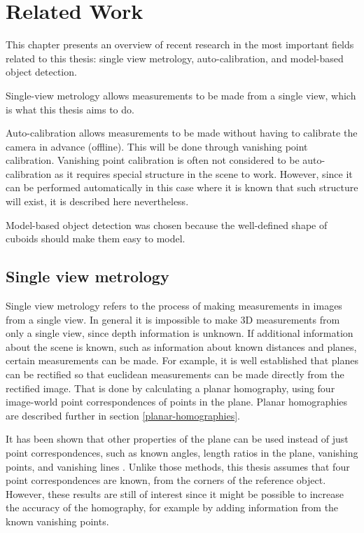 \chapter{Related Work}
This chapter presents an overview of recent research in the most important fields related to this thesis: single view metrology, auto-calibration, and model-based object detection.

Single-view metrology allows measurements to be made from a single view, which is what this thesis aims to do.

Auto-calibration allows measurements to be made without having to calibrate the camera in advance (offline).
This will be done through vanishing point calibration.
Vanishing point calibration is often not considered to be auto-calibration as it requires special structure in the scene to work. 
However, since it can be performed automatically in this case where it is known that such structure will exist, it is described here nevertheless.

Model-based object detection was chosen because the well-defined shape of cuboids should make them easy to model.

\section{Single view metrology}
Single view metrology refers to the process of making measurements in images from a single view.
In general it is impossible to make 3D measurements from only a single view, since depth information is unknown.
If additional information about the scene is known, such as information about known distances and planes, certain measurements can be made.
For example, it is well established that planes can be rectified so that euclidean measurements can be made directly from the rectified image.
That is done by calculating a planar homography, using four image-world point correspondences of points in the plane.
Planar homographies are described further in section \ref{planar-homographies}.

It has been shown that other properties of the plane can be used instead of just point correspondences, such as known angles, length ratios in the plane, vanishing points, and vanishing lines \cite{liebowitz1998metric} \cite{criminisi2000single}.
Unlike those methods, this thesis assumes that four point correspondences are known, from the corners of the reference object.
However, these results are still of interest since it might be possible to increase the accuracy of the homography, for example by adding information from the known vanishing points.

